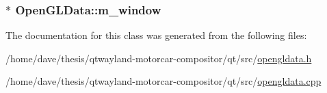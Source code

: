 \hypertarget{classOpenGLData_ad4867a83945326a3523a1aa54bc1f016}{
\subsubsection[{m\-\_\-window}]{$\ast$ Open\-G\-L\-Data\-::m\-\_\-window}}\label{classOpenGLData_ad4867a83945326a3523a1aa54bc1f016}


The documentation for this class was generated from the following files\-:\begin{DoxyCompactItemize}
\item 
/home/dave/thesis/qtwayland-\/motorcar-\/compositor/qt/src/\hyperlink{opengldata_8h}{opengldata.\-h}\item 
/home/dave/thesis/qtwayland-\/motorcar-\/compositor/qt/src/\hyperlink{opengldata_8cpp}{opengldata.\-cpp}\end{DoxyCompactItemize}
